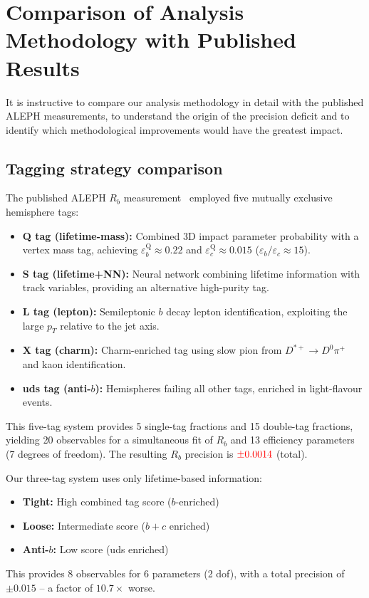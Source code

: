 \documentclass[11pt,a4paper]{article}
\newcommand{\external}[1]{\textcolor{red}{#1}}
\begin{document}
\section{Comparison of Analysis Methodology with Published Results}
\label{sec:method_comparison}

It is instructive to compare our analysis methodology in detail
with the published ALEPH measurements, to understand the origin
of the precision deficit and to identify which methodological
improvements would have the greatest impact.

\subsection{Tagging strategy comparison}
\label{sec:method:tagging}

The published ALEPH $R_b$ measurement~\cite{ALEPH:Rb:1996}
employed five mutually exclusive hemisphere tags:
\begin{itemize}
\item \textbf{Q tag (lifetime-mass):} Combined 3D impact parameter
  probability with a vertex mass tag, achieving
  $\varepsilon_b^\text{Q} \approx 0.22$ and
  $\varepsilon_c^\text{Q} \approx 0.015$
  ($\varepsilon_b/\varepsilon_c \approx 15$).
\item \textbf{S tag (lifetime+NN):} Neural network combining
  lifetime information with track variables, providing an
  alternative high-purity tag.
\item \textbf{L tag (lepton):} Semileptonic $b$ decay lepton
  identification, exploiting the large $p_T$ relative to the
  jet axis.
\item \textbf{X tag (charm):} Charm-enriched tag using slow pion
  from $D^{*+} \to D^0\pi^+$ and kaon identification.
\item \textbf{uds tag (anti-$b$):} Hemispheres failing all other
  tags, enriched in light-flavour events.
\end{itemize}

This five-tag system provides 5 single-tag fractions and 15
double-tag fractions, yielding 20 observables for a simultaneous
fit of $R_b$ and 13 efficiency parameters (7 degrees of freedom).
The resulting $R_b$ precision is
$\external{\pm 0.0014}$ (total).

Our three-tag system uses only lifetime-based information:
\begin{itemize}
\item \textbf{Tight:} High combined tag score ($b$-enriched)
\item \textbf{Loose:} Intermediate score ($b+c$ enriched)
\item \textbf{Anti-$b$:} Low score (uds enriched)
\end{itemize}
This provides 8 observables for 6 parameters (2 dof), with a
total precision of $\pm 0.015$ -- a factor of $10.7\times$
worse.
\end{document}
